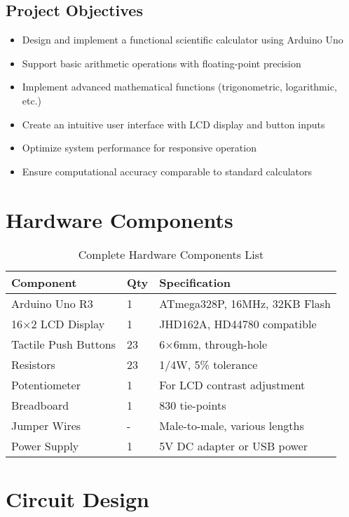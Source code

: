\documentclass[journal]{IEEEtran}
\begin{document}
\subsection{Project Objectives}
\begin{itemize}
    \item Design and implement a functional scientific calculator using Arduino Uno
    \item Support basic arithmetic operations with floating-point precision
    \item Implement advanced mathematical functions (trigonometric, logarithmic, etc.)
    \item Create an intuitive user interface with LCD display and button inputs
    \item Optimize system performance for responsive operation
    \item Ensure computational accuracy comparable to standard calculators
\end{itemize}

\section{Hardware Components}
\begin{table}[H]
\centering
\caption{Complete Hardware Components List}
\begin{tabularx}{\textwidth}{|l|l|X|}
\hline
\textbf{Component} & \textbf{Qty} & \textbf{Specification} \\ \hline
Arduino Uno R3 & 1 & ATmega328P, 16MHz, 32KB Flash \\ \hline
16×2 LCD Display & 1 & JHD162A, HD44780 compatible \\ \hline
Tactile Push Buttons & 23 & 6×6mm, through-hole \\ \hline
 Resistors & 23 & 1/4W, 5\% tolerance \\ \hline
Potentiometer & 1 & For LCD contrast adjustment \\ \hline
Breadboard & 1 & 830 tie-points \\ \hline
Jumper Wires & - & Male-to-male, various lengths \\ \hline
Power Supply & 1 & 5V DC adapter or USB power \\ \hline
\end{tabularx}
\end{table}

\section{Circuit Design}
\end{document}
